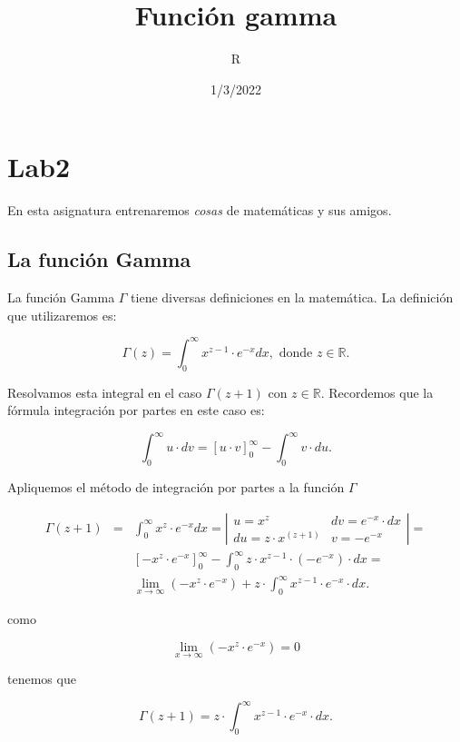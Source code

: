 \documentclass[
]{article}
\title{Función gamma}
\author{R}
\date{1/3/2022}
\begin{document}
\maketitle

\hypertarget{lab2}{%
\section{Lab2}\label{lab2}}

En esta asignatura entrenaremos \emph{cosas} de matemáticas y sus
amigos.

\hypertarget{la-funciuxf3n-gamma}{%
\subsection{La función Gamma}\label{la-funciuxf3n-gamma}}

La función Gamma \(\Gamma\) tiene diversas definiciones en la
matemática. La definición que utilizaremos es:

\[ \Gamma(z)= \int_0^{\infty} x^{z-1} \cdot e^{-x}dx, \mbox{ donde } z\in \mathbb{R}.\]

Resolvamos esta integral en el caso \(\Gamma(z+1)\) con
\(z\in \mathbb{R}\). Recordemos que la fórmula integración por partes en
este caso es:

\[\int_{0}^{\infty} u \cdot d v =\left[u\cdot v \right]_0^\infty-\int_0^{\infty} v \cdot du.\]

Apliquemos el método de integración por partes a la función \(\Gamma\)

\[\begin{eqnarray}
\Gamma(z+1) &=&  \int_0^{\infty} x^{z} \cdot e^{-x}dx= 
\left|
\begin{matrix} u=x^{z}  & dv= e^{-x}\cdot  dx 
\\ du= z \cdot x^(z+1)  & v=-e^{-x} 
\end{matrix}
\right|=\\
&& \left[-x^z\cdot e^{-x}\right]_0^\infty
-\int_0^{\infty} z\cdot x^{z-1} \cdot \left(-e^{-x}\right)\cdot  dx=\\
&&
\lim_{x\to\infty}\left(-x^z\cdot e^{-x}\right)
+
z\cdot \int_0^{\infty} x^{z-1} \cdot e^{-x}\cdot dx.
\end{eqnarray}
\]

como

\[\lim_{x\to\infty}\left(-x^z\cdot e^{-x}\right)=0\]

tenemos que

\[\Gamma(z+1)= 
z\cdot \int_0^{\infty} x^{z-1} \cdot e^{-x}\cdot  dx.
\]
\end{document}
